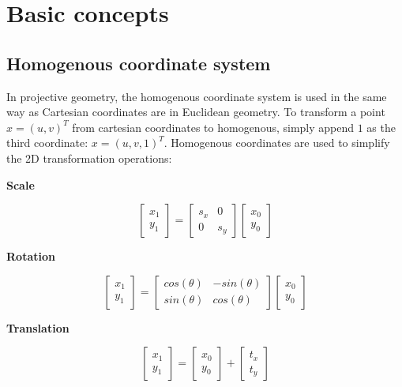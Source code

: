 \chapter{Basic concepts}
\label{chapter:epipilar_geo}

\section{Homogenous coordinate system}

In projective geometry, the homogenous coordinate system is used in the same way as Cartesian coordinates are in Euclidean geometry.
To transform a point $x=(u, v)^T$ from cartesian coordinates to homogenous, simply append $1$ as the third coordinate: $x=(u, v, 1)^T$.
Homogenous coordinates are used to simplify the 2D transformation operations:

\begin{center}
    \textbf{Scale}
\end{center}
$$
\begin{bmatrix}
    x_1 \\ y_1
\end{bmatrix} = 
\begin{bmatrix}
    s_x & 0 \\
    0 & s_y
\end{bmatrix}
\begin{bmatrix}
    x_0 \\ y_0
\end{bmatrix}
$$ 
\begin{center}
    \textbf{Rotation}    
\end{center}
$$
\begin{bmatrix}
    x_1 \\ y_1
\end{bmatrix} = 
\begin{bmatrix}
    cos(\theta) & -sin(\theta) \\
    sin(\theta) & cos(\theta)
\end{bmatrix}
\begin{bmatrix}
    x_0 \\ y_0
\end{bmatrix}
$$
\begin{center}
    \textbf{Translation}    
\end{center}
$$
\begin{bmatrix}
    x_1 \\ y_1
\end{bmatrix} = 
\begin{bmatrix}
    x_0 \\ y_0
\end{bmatrix} +
\begin{bmatrix}
    t_x \\ t_y
\end{bmatrix}
$$ 

